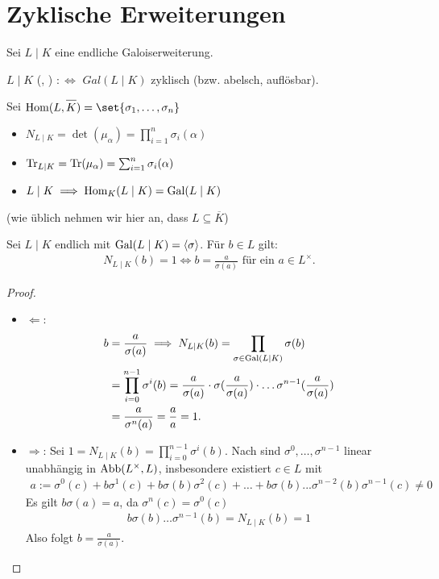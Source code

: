 \section{Zyklische Erweiterungen}
Sei $L \mid K$ eine endliche Galoiserweiterung.
\begin{definition}
	$L\mid K$  (, ) $:\Leftrightarrow$ $Gal(L\mid K)$ zyklisch (bzw. abelsch, auflösbar).
\end{definition}
\begin{remark}[Erinnerung]
	Sei $\Hom(L,\overline{K}) = \set{\sigma_1,\dots, \sigma_n}$
	\begin{itemize}
		\item $N_{L \mid K} = \det(\mu_{\alpha}) = \prod_{i=1}^n \sigma_i(\alpha)$
		\item $\operatorname{Tr}_{L\mid K} = \operatorname{Tr}(\mu_{\alpha}) = \sum_{i=1}^n \sigma_i(\alpha)$
		\item $L \mid K \implies \operatorname{Hom}_K(L\mid K) = \operatorname{Gal}(L\mid K)$
	\end{itemize}
	(wie üblich nehmen wir hier an, dass $L \subseteq \overline{K}$)
\end{remark}
\begin{proposition}
	Sei $L \mid K$ endlich mit $\operatorname{Gal}(L \mid K) = \langle \sigma\rangle$. Für $b \in L$ gilt:
	\begin{align*}
		N_{L\mid K}(b)  = 1 \Leftrightarrow b = \frac{a}{\sigma(a)} \text{ für ein } a \in L^{\times}.
	\end{align*}
\end{proposition}
\begin{proof}
	\begin{itemize}
		Sei $n= [L:K]$.
		\item $\Leftarrow$:
		\begin{align*}
			b &= \frac{a}{\sigma(a)} \implies N_{L\mid K} (b) = \prod_{\sigma \in \operatorname{Gal}(L\mid K)} \sigma(b)\\
			&= \prod_{i=0}^{n-1} \sigma^i(b) = \frac{a}{\sigma(a)}\cdot \sigma(\frac{a}{\sigma(a)})\cdot \dots \sigma^{n-1}(\frac{a}{\sigma(a)})\\
			&= \frac{a}{\sigma^n(a)} = \frac{a}{a} = 1.
		\end{align*}
		\item $\Rightarrow$: Sei $1 = N_{L\mid K}(b) = \prod_{i=0}^{n-1} \sigma^i(b)$. Nach  sind $\sigma^0, \dots, \sigma^{n-1}$ linear unabhängig in $\operatorname{Abb}(L^{\times},L)$, insbesondere existiert $c \in L$ mit 
		\begin{align*}
			a:= \sigma^0(c) + b\sigma^1(c) + b\sigma(b)\sigma^2(c) + \dots + b \sigma(b)...\sigma^{n-2}(b)\sigma^{n-1}(c) \neq 0
		\end{align*}
		Es gilt $b\sigma(a) = a$, da $\sigma^n(c) = \sigma^0(c)$
		\begin{align*}
			b\sigma(b)\dots \sigma^{n-1}(b) = N_{L\mid K}(b) = 1
		\end{align*}
		Also folgt $b = \frac{a}{\sigma(a)}$.
	\end{itemize}
\end{proof}
